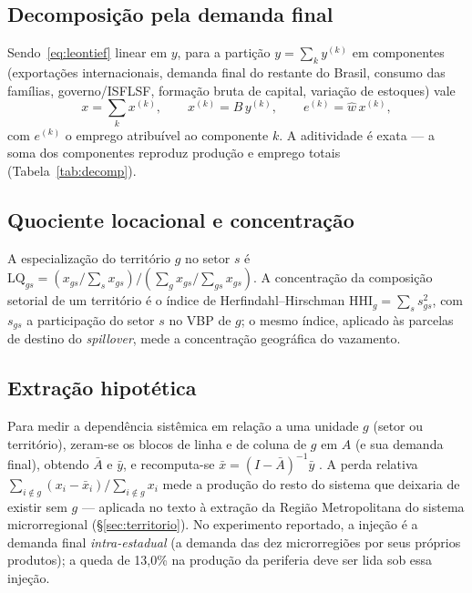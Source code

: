 \documentclass[11pt,a4paper]{article}
\begin{document}
\subsection{Decomposição pela demanda final}
\label{ap:fd}
Sendo~\eqref{eq:leontief} linear em $y$, para a partição $y=\sum_k y^{(k)}$ em componentes
(exportações internacionais, demanda final do restante do Brasil, consumo das famílias,
governo/ISFLSF, formação bruta de capital, variação de estoques) vale
\begin{equation}
x=\sum_k x^{(k)},\qquad x^{(k)}=B\,y^{(k)},\qquad e^{(k)}=\hat{w}\,x^{(k)},
\label{eq:fd}
\end{equation}
com $e^{(k)}$ o emprego atribuível ao componente $k$. A aditividade é exata --- a soma dos
componentes reproduz produção e emprego totais (Tabela~\ref{tab:decomp}).

\subsection{Quociente locacional e concentração}
\label{ap:lq}
A especialização do território $g$ no setor $s$ é
$\mathrm{LQ}_{gs}=(x_{gs}/\sum_s x_{gs})\big/(\sum_g x_{gs}/\sum_{gs}x_{gs})$. A
concentração da composição setorial de um território é o índice de Herfindahl--Hirschman
$\mathrm{HHI}_g=\sum_s s_{gs}^2$, com $s_{gs}$ a participação do setor $s$ no VBP de $g$;
o mesmo índice, aplicado às parcelas de destino do \emph{spillover}, mede a concentração
geográfica do vazamento.

\subsection{Extração hipotética}
\label{ap:hem}
Para medir a dependência sistêmica em relação a uma unidade $g$ (setor ou território),
zeram-se os blocos de linha e de coluna de $g$ em $A$ (e sua demanda final), obtendo
$\bar{A}$ e $\bar{y}$, e recomputa-se $\bar{x}=(I-\bar{A})^{-1}\bar{y}$
\citep{dietzenbacher1993,millerblair2009}. A perda relativa
$\sum_{i\notin g}(x_i-\bar{x}_i)\big/\sum_{i\notin g}x_i$ mede a produção do resto do
sistema que deixaria de existir sem $g$ --- aplicada no texto à extração da Região
Metropolitana do sistema microrregional (\S\ref{sec:territorio}). No experimento reportado,
a injeção é a demanda final \emph{intra-estadual} (a demanda das dez microrregiões por seus
próprios produtos); a queda de 13,0\% na produção da periferia deve ser lida sob essa
injeção.

\end{document}
